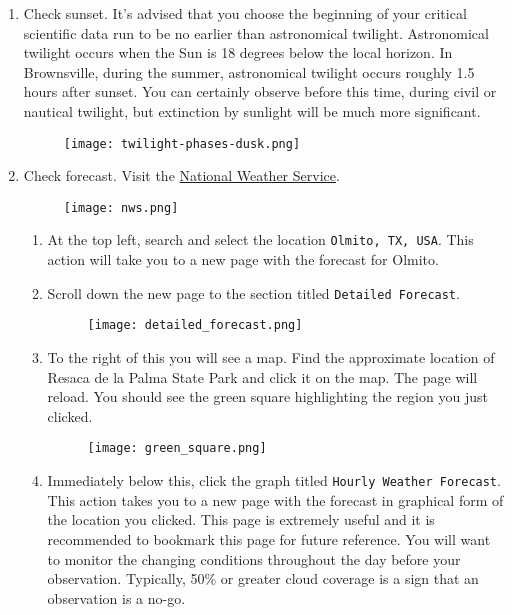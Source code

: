 \documentclass{article}
\begin{document}
	\begin{enumerate}
		
		\item Check sunset. It's advised that you choose the beginning of your critical scientific data run to be no earlier than astronomical twilight. Astronomical twilight occurs when the Sun is 18 degrees below the local horizon. In Brownsville, during the summer, astronomical twilight occurs roughly 1.5 hours after sunset. You can certainly observe before this time, during civil or nautical twilight, but extinction by sunlight will be much more significant.
		
		\begin{figure}[h]
			\centering
			\texttt{[image: twilight-phases-dusk.png]}
		\end{figure}
		
		\item Check forecast. Visit the \href{https://www.weather.gov}{National Weather Service}.
		
		\begin{figure}[h]
			\centering
			\texttt{[image: nws.png]}
		\end{figure}
		
		\begin{enumerate}
			
			\item At the top left, search and select the location \texttt{Olmito, TX, USA}. This action will take you to a new page with the forecast for Olmito.		
			
			\item Scroll down the new page to the section titled \texttt{Detailed Forecast}.
			
			\begin{figure}[h]
				\centering
				\texttt{[image: detailed\_forecast.png]}
			\end{figure}
			
			\item To the right of this you will see a map. Find the approximate location of Resaca de la Palma State Park and click it on the map. The page will reload. You should see the green square highlighting the region you just clicked.
			
			\begin{figure}[h]
				\centering
				\texttt{[image: green\_square.png]}
			\end{figure}
			
			\item Immediately below this, click the graph titled \texttt{Hourly Weather Forecast}. This action takes you to a new page with the forecast in graphical form of the location you clicked. This page is extremely useful and it is recommended to bookmark this page for future reference. You will want to monitor the changing conditions throughout the day before your observation. Typically, 50\% or greater cloud coverage is a sign that an observation is a no-go.
			

\end{enumerate}
\end{enumerate}
\end{document}
